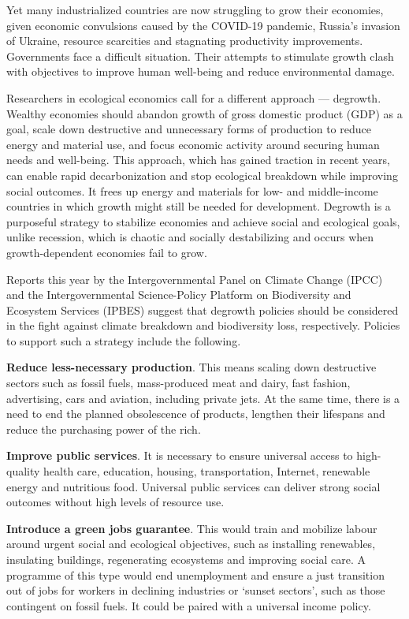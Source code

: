 \documentclass[
]{book}
\begin{document}
Yet many industrialized countries are now struggling to grow their economies, given economic convulsions caused by the COVID-19 pandemic, Russia's invasion of Ukraine, resource scarcities and stagnating productivity improvements. Governments face a difficult situation. Their attempts to stimulate growth clash with objectives to improve human well-being and reduce environmental damage.

Researchers in ecological economics call for a different approach --- degrowth. Wealthy economies should abandon growth of gross domestic product (GDP) as a goal, scale down destructive and unnecessary forms of production to reduce energy and material use, and focus economic activity around securing human needs and well-being. This approach, which has gained traction in recent years, can enable rapid decarbonization and stop ecological breakdown while improving social outcomes. It frees up energy and materials for low- and middle-income countries in which growth might still be needed for development. Degrowth is a purposeful strategy to stabilize economies and achieve social and ecological goals, unlike recession, which is chaotic and socially destabilizing and occurs when growth-dependent economies fail to grow.

Reports this year by the Intergovernmental Panel on Climate Change (IPCC) and the Intergovernmental Science-Policy Platform on Biodiversity and Ecosystem Services (IPBES) suggest that degrowth policies should be considered in the fight against climate breakdown and biodiversity loss, respectively. Policies to support such a strategy include the following.

\textbf{Reduce less-necessary production}. This means scaling down destructive sectors such as fossil fuels, mass-produced meat and dairy, fast fashion, advertising, cars and aviation, including private jets. At the same time, there is a need to end the planned obsolescence of products, lengthen their lifespans and reduce the purchasing power of the rich.

\textbf{Improve public services}. It is necessary to ensure universal access to high-quality health care, education, housing, transportation, Internet, renewable energy and nutritious food. Universal public services can deliver strong social outcomes without high levels of resource use.

\textbf{Introduce a green jobs guarantee}. This would train and mobilize labour around urgent social and ecological objectives, such as installing renewables, insulating buildings, regenerating ecosystems and improving social care. A programme of this type would end unemployment and ensure a just transition out of jobs for workers in declining industries or `sunset sectors', such as those contingent on fossil fuels. It could be paired with a universal income policy.
\end{document}
